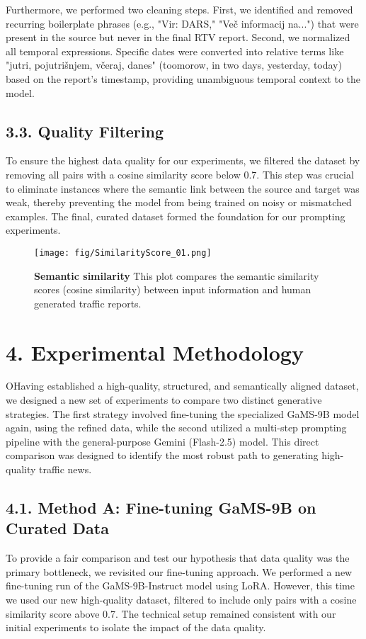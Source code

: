 \documentclass[fleqn,moreauthors,10pt]{ds_report}
\begin{document}
Furthermore, we performed two cleaning steps. First, we identified and removed recurring boilerplate phrases (e.g., "Vir: DARS," "Več informacij na...") that were present in the source but never in the final RTV report. Second, we normalized all temporal expressions. Specific dates were converted into relative terms like "jutri, pojutrišnjem, včeraj, danes" (toomorow, in two days, yesterday, today) based on the report's timestamp, providing unambiguous temporal context to the model.

\subsection*{3.3. Quality Filtering}
To ensure the highest data quality for our experiments, we filtered the dataset by removing all pairs with a cosine similarity score below 0.7. This step was crucial to eliminate instances where the semantic link between the source and target was weak, thereby preventing the model from being trained on noisy or mismatched examples. The final, curated dataset formed the foundation for our prompting experiments.

\begin{figure}[ht]\centering
    \texttt{[image: fig/SimilarityScore\_01.png]}
    \caption{\textbf{Semantic similarity} This plot compares the semantic similarity scores (cosine similarity) between input information and human generated traffic reports.}
    \label{fig:similarity-bert-single}
\end{figure}

\section*{4. Experimental Methodology}
OHaving established a high-quality, structured, and semantically aligned dataset, we designed a new set of experiments to compare two distinct generative strategies. The first strategy involved fine-tuning the specialized GaMS-9B model again, using the refined data, while the second utilized a multi-step prompting pipeline with the general-purpose Gemini (Flash-2.5) model. This direct comparison was designed to identify the most robust path to generating high-quality traffic news.

\subsection*{4.1. Method A: Fine-tuning GaMS-9B on Curated Data}
To provide a fair comparison and test our hypothesis that data quality was the primary bottleneck, we revisited our fine-tuning approach. We performed a new fine-tuning run of the GaMS-9B-Instruct model using LoRA. However, this time we used our new high-quality dataset, filtered to include only pairs with a cosine similarity score above 0.7. The technical setup remained consistent with our initial experiments to isolate the impact of the data quality. 
\end{document}
